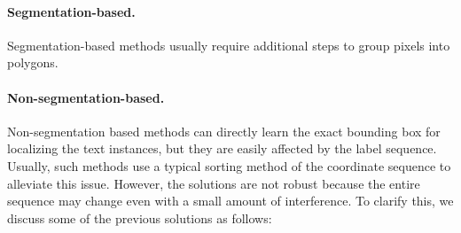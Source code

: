 \paragraph{Segmentation-based.} Segmentation-based methods \cite{zhang2016multi,long2015fully,he2017mask,deng2018pixellink,lyu2018multi,wu2017self,wang2019shape,he2016text} usually require additional steps to group pixels into polygons. 

\paragraph{Non-segmentation-based.} Non-segmentation based methods \cite{zhu2018sliding,xue2019msr,liao2018rotation,ma2018arbitrary,liao2018textboxes++,he2018end,liu2017deep,zhou2017east,he2017deep} can directly learn the exact bounding box for localizing the text instances, but they are easily affected by the label sequence. Usually, such methods use a typical sorting method of the coordinate sequence to alleviate this issue. However, the solutions are not robust because the entire sequence may change even with a small amount of interference. To clarify this, we discuss some of the previous solutions as follows:

